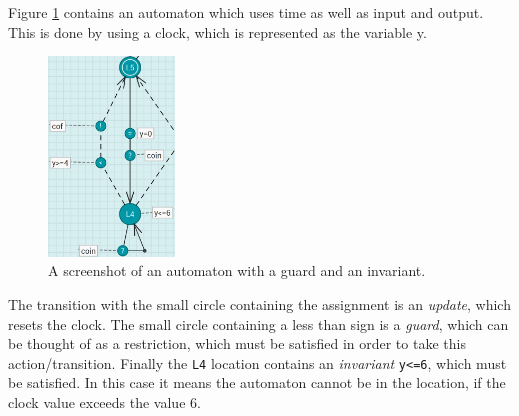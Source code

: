 Figure \ref{fig:ECDAR-guard} contains an automaton which uses time as well as input and output.
This is done by using a clock, which is represented as the variable y.
\begin{figure}[H]
    \centering
    \includegraphics[width=0.3\textwidth]{common/figures/ecdar-guards.jpg}
    \caption{A screenshot of an automaton with a guard and an invariant.}
    \label{fig:ECDAR-guard}
\end{figure}
The transition with the small circle containing the assignment is an \textit{update}, which resets the clock.
The small circle containing a less than sign is a \textit{guard}, which can be thought of as a restriction, which must be satisfied in order to take this action/transition.
Finally the \texttt{L4} location contains an \textit{invariant} \texttt{y<=6}, which must be satisfied. 
In this case it means the automaton cannot be in the location, if the clock value exceeds the value 6.

